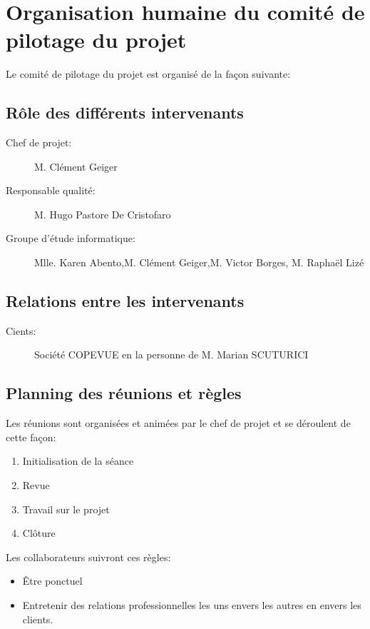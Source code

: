 
\section{Organisation humaine du comité de pilotage du projet}

Le comité de pilotage du projet est organisé de la façon suivante:

    \subsection{Rôle des différents intervenants}
\begin{description}
\item[Chef de projet:]M. Clément Geiger
\item[Responsable qualité:]M. Hugo Pastore De Cristofaro
\item[Groupe d'étude informatique:]Mlle. Karen Abento,M. Clément Geiger,M. Victor Borges, M. Raphaël Lizé
\end{description}

    \subsection{Relations entre les intervenants}
\begin{description}
\item[Cients:]Société COPEVUE en la personne de M. Marian SCUTURICI
\end{description}

    \subsection{Planning des réunions et règles}
Les réunions sont organisées et animées par le chef de projet et se
déroulent de cette façon:
\begin{enumerate}
\item Initialisation de la séance
\item Revue
\item Travail sur le projet
\item Clôture
\end{enumerate}

Les collaborateurs suivront ces règles:
\begin{itemize}
\item Être ponctuel
\item Entretenir des relations professionnelles les uns envers les
        autres en envers les clients.
\end{itemize}

